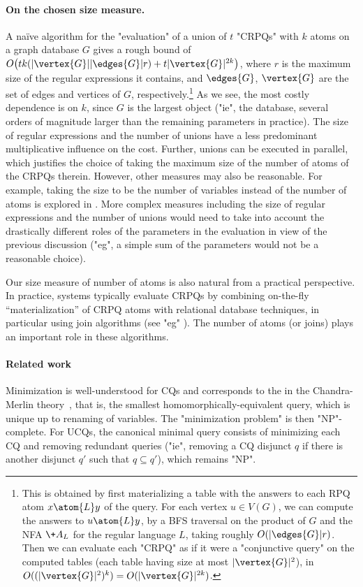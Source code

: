 \paragraph{On the chosen size measure.}
A naïve algorithm for the "evaluation" of a union of $t$ "CRPQs" with $k$ atoms on a graph database $G$ gives a rough bound of $O\big(t  k  (|\vertex{G}||\edges{G}| r) + t  |\vertex{G}|^{2k}\big)$, where $r$ is the maximum size of the regular expressions it contains, and $\edges{G}$, $\vertex{G}$ are the set of edges and vertices of $G$, respectively.\footnote{This is obtained by first materializing a table with the answers to each RPQ atom $x \atom{L} y$ of the query. For each vertex $u\in V(G)$, we can compute the answers to $u \atom{L} y$, by a BFS traversal on the product of $G$ and   the NFA $\+A_L$ for the regular language $L$, taking roughly $O(|\edges{G}| r)$. Then we can evaluate each "CRPQ" as if it were a "conjunctive query" on the computed tables (each table having size at most $|\vertex{G}|^2$), in $O((|\vertex{G}|^2)^k) = O(|\vertex{G}|^{2k})$.}
As we see, the most costly dependence is on $k$, since $G$ is the largest object ("ie", the database, several orders of magnitude larger than the remaining parameters in practice). The size of regular expressions and the number of unions have a less predominant multiplicative influence on the cost.
Further, unions can be executed in parallel, which justifies the choice of taking the maximum size of the number of atoms of the CRPQs therein.
However, other measures may also be reasonable. For example, taking the size to be the number of variables instead of the number of atoms is explored in .
More complex measures including the size of regular expressions and the number of unions would need to take into account the drastically different roles of the parameters in the evaluation in view of the previous discussion ("eg", a simple sum of the parameters would not be a reasonable choice).

Our size measure of number of atoms is also natural from a practical perspective. In practice, systems typically evaluate CRPQs by combining   on-the-fly ``materialization'' of CRPQ atoms  with  relational database techniques, in particular using join algorithms (see "eg" \cite{VrgocEtal2024MillenniumDB,KaralisBigerlHeidrichSherifNgongaNgomo2024Efficient,CucumidesReutterVrgoc2024SizeBounds}).  The number of atoms (or joins) plays an important role in these algorithms.
	
\paragraph{Related work}
Minimization is well-understood for CQs and corresponds to the  in the Chandra-Merlin theory~\cite{ChandraMerlin1977Implementation}, that is, the smallest homomorphically-equivalent query, which is unique up to renaming of variables. The "minimization problem" is then "NP"-complete.
For UCQs, the canonical minimal query consists of minimizing each CQ and removing redundant queries ("ie", removing a CQ disjunct $q$ if there is another disjunct $q'$ such that $q \subseteq q'$), which remains "NP".

